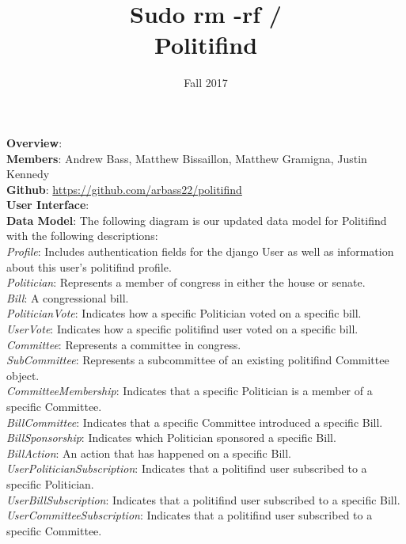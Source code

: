 \documentclass{article}
\newcommand{\n}{\noindent}
\begin{document}
\title{Sudo rm -rf / \\ \large{Politifind}}
\author{Fall 2017}
\date{}
\maketitle

\n\textbf{Overview}:\\

\n\textbf{Members}: Andrew Bass, Matthew Bissaillon, Matthew Gramigna, Justin Kennedy \\

\n\textbf{Github}: \url{https://github.com/arbass22/politifind} \\

\n\textbf{User Interface}: \\

\n\textbf{Data Model}: The following diagram is our updated data model for Politifind with the following descriptions: \\ 

\n\textit{Profile}: Includes authentication fields for the django User as well as information about this user's politifind profile. \\
\n\textit{Politician}: Represents a member of congress in either the house or senate. \\
\n\textit{Bill}: A congressional bill.\\
\n\textit{PoliticianVote}: Indicates how a specific Politician voted on a specific bill. \\
\n\textit{UserVote}: Indicates how a specific politifind user voted on a specific bill.\\
\n\textit{Committee}: Represents a committee in congress. \\
\n\textit{SubCommittee}: Represents a subcommittee of an existing politifind Committee object. \\
\n\textit{CommitteeMembership}: Indicates that a specific Politician is a member of a specific Committee. \\
\n\textit{BillCommittee}: Indicates that a specific Committee introduced a specific Bill. \\
\n\textit{BillSponsorship}: Indicates which Politician sponsored a specific Bill. \\
\n\textit{BillAction}: An action that has happened on a specific Bill. \\
\n\textit{UserPoliticianSubscription}: Indicates that a politifind user subscribed to a specific Politician. \\
\n\textit{UserBillSubscription}: Indicates that a politifind user subscribed to a specific Bill.\\
\n\textit{UserCommitteeSubscription}: Indicates that a politifind user subscribed to a specific Committee.\\
\end{document}
